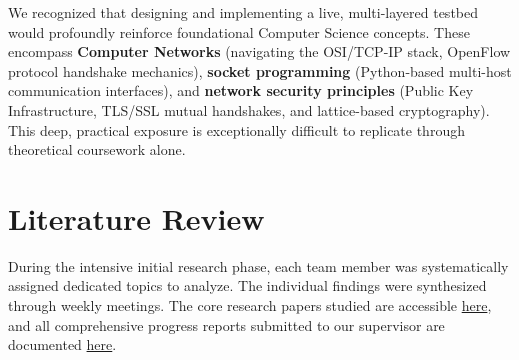 \documentclass[12pt]{article}
\begin{document}
We recognized that designing and implementing a live, multi-layered testbed would profoundly reinforce foundational Computer Science concepts. These encompass \textbf{Computer Networks} (navigating the OSI/TCP-IP stack, OpenFlow protocol handshake mechanics), \textbf{socket programming} (Python-based multi-host communication interfaces), and \textbf{network security principles} (Public Key Infrastructure, TLS/SSL mutual handshakes, and lattice-based cryptography). This deep, practical exposure is exceptionally difficult to replicate through theoretical coursework alone.

\section{Literature Review}

During the intensive initial research phase, each team member was systematically assigned dedicated topics to analyze. The individual findings were synthesized through weekly meetings. The core research papers studied are accessible \href{https://drive.google.com/drive/folders/1BSMeBRWVAG62EkNObfvfdMOySwlcKqhh?usp=sharing}{here}, and all comprehensive progress reports submitted to our supervisor are documented \href{https://drive.google.com/drive/folders/1BXAUxodpSBru3QzQASHnL8ZOC4hR6Zsf?usp=sharing}{here}.
\end{document}
